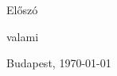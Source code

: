 \documentclass[../main.tex]{subfiles}
\begin{document}
{\Large{Előszó}}

valami

Budapest, \today

\myname
\end{document}
